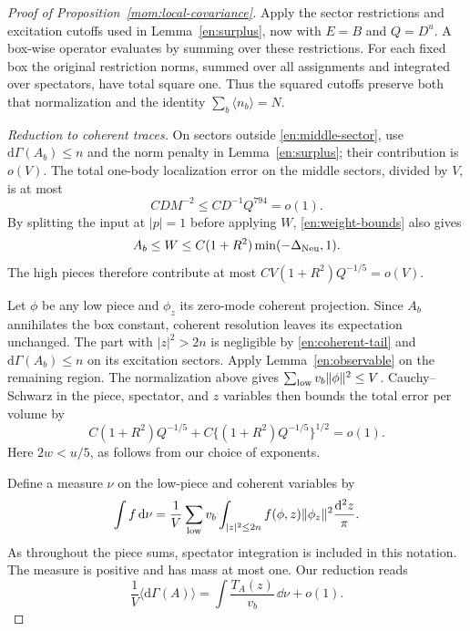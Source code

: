 \begin{proof}[Proof of Proposition~\ref{mom:local-covariance}]
Apply the sector restrictions and excitation cutoffs used in
Lemma~\ref{en:surplus}, now with $E=B$ and $Q=D^u$.
A box-wise operator evaluates by summing over these restrictions.
For each fixed box the original restriction norms, summed over all
assignments and integrated over spectators, have total square one.
Thus the squared cutoffs preserve both that normalization and the
identity $\sum_b\langle n_b\rangle=N$.

\emph{Reduction to coherent traces.}
On sectors outside \eqref{en:middle-sector}, use
$\mathrm d\Gamma(A_b)\le n$ and the norm penalty in
Lemma~\ref{en:surplus}; their contribution is $o(V)$.
The total one-body localization error on the middle sectors, divided
by $V$, is at most
\[
 CDM^{-2}\le CD^{-1}Q^{794}=o(1).
\]
By splitting the input at $|p|=1$ before applying $W$,
\eqref{en:weight-bounds} also gives
\[
 A_b\le W\le C(1+R^2)\min(-\Delta_{\rm Neu},1).
\]
The high pieces therefore contribute at most
$CV(1+R^2)Q^{-1/5}=o(V)$.

Let $\phi$ be any low piece and $\phi_z$ its zero-mode coherent
projection.  Since $A_b$ annihilates the box constant, coherent
resolution leaves its expectation unchanged.  The part with
$|z|^2>2n$ is negligible by \eqref{en:coherent-tail} and
$\mathrm d\Gamma(A_b)\le n$ on its excitation sectors.  Apply
Lemma~\ref{en:observable} on the remaining region.  The normalization
above gives $\sum_{\rm low}v_b\|\phi\|^2\le V$.  Cauchy--Schwarz
in the piece, spectator, and $z$ variables then bounds the total error
per volume by
\begin{equation}\label{en:occupation-error}
 C(1+R^2)Q^{-1/5}
       +C\{(1+R^2)Q^{-1/5}\}^{1/2}=o(1).
\end{equation}
Here $2w<u/5$, as follows from our choice of exponents.

Define a measure $\nu$ on the low-piece and coherent variables by
\begin{equation}\label{en:coherent-measure}
 \int f\,\mathrm d\nu
  =\frac1V\sum_{\rm low}v_b
       \int_{|z|^2\le2n}f(\phi,z)\|\phi_z\|^2
                                      \frac{\mathrm d^2z}{\pi}.
\end{equation}
As throughout the piece sums, spectator integration is included in
this notation.  The measure is positive and has mass at most one.
Our reduction reads
\begin{equation}\label{en:coherent-trace-reduction}
 \frac1V\langle\mathrm d\Gamma(A)\rangle
       =\int\frac{T_A(z)}{v_b}\,\dd\nu+o(1).
\end{equation}


\end{proof}
